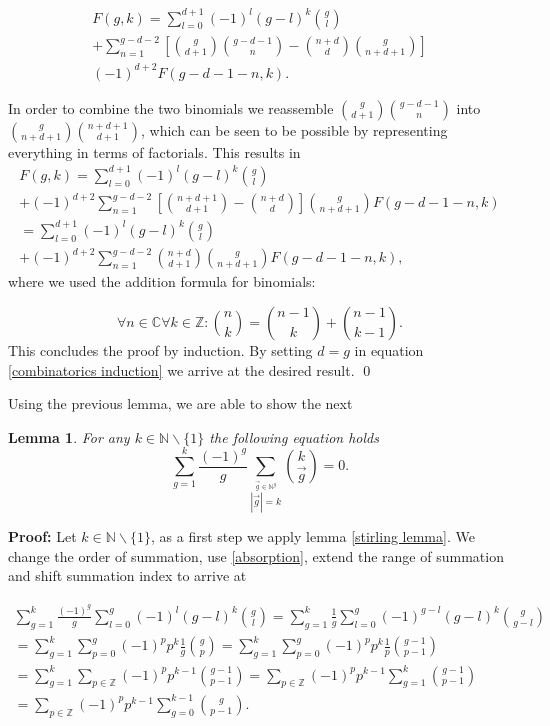 \documentclass[b5paper,draft,openbib,12pt]{memoir}
\newtheorem{Lemma}[Def]{Lemma}
\begin{document}
\begin{multline}
F(g,k)= \sum_{l=0}^{d+1} (-1)^l (g-l)^k \binom{g}{l}\\
+ \sum_{n=1}^{g-d-2}\left[\binom{g}{d+1} \binom{g-d-1}{n} - \binom{n+d}{d} \binom{g}{n+d+1} \right] 
\\(-1)^{d+2} F(g-d-1-n,k).
\end{multline}


In order to combine the two binomials we reassemble \(\binom{g}{d+1}\binom{g-d-1}{n}\) 
into \(\binom{g}{n+d+1}\binom{n+d+1}{d+1}\), which can be seen to be possible by representing everything
in terms of factorials. This results in
\begin{multline}
F(g,k)= \sum_{l=0}^{d+1} (-1)^l (g-l)^k \binom{g}{l}\\
+(-1)^{d+2} \sum_{n=1}^{g-d-2}\left[\binom{n+d+1}{d+1} - \binom{n+d}{d}\right] \binom{g}{n+d+1} 
 F(g-d-1-n,k)\\
=\sum_{l=0}^{d+1} (-1)^l (g-l)^k \binom{g}{l}\\
+(-1)^{d+2}  \sum_{n=1}^{g-d-2} \binom{n+d}{d+1} \binom{g}{n+d+1}  F(g-d-1-n,k),
\end{multline}
where we used the addition formula for binomials:

\begin{equation}
\forall n\in \mathbb{C} \forall k \in \mathbb{Z}: \binom{n}{k} = \binom{n-1}{k} + \binom{n-1}{k-1}.
\end{equation}
This concludes the proof by induction. By setting \(d=g\) in equation \eqref{combinatorics induction} 
we arrive at the desired result. \qed

Using the previous lemma, we are able to show the next

\begin{Lemma}\label{combinatorics weak conjecture lemma 2}
For any \(k \in \mathbb{N}\backslash \{1\}\) the following equation holds
\begin{equation}
\sum_{g=1}^k \frac{(-1)^g}{g} \sum_{\stackrel{\vec{g}\in\mathbb{N}^g}{|\vec{g}|=k}}\binom{k}{\vec{g}}=0.
\end{equation}
\end{Lemma}
\textbf{Proof:} Let \(k\in\mathbb{N}\backslash\{1\}\), as a first step we apply lemma \ref{stirling lemma}.
We change the order of summation, use \eqref{absorption}, extend the range of summation and shift 
summation index  to arrive at

\begin{multline}
\sum_{g=1}^k \frac{(-1)^g}{g} \sum_{l=0}^g (-1)^l (g-l)^k \binom{g}{l}
= \sum_{g=1}^k \frac{1}{g} \sum_{l=0}^g (-1)^{g-l} (g-l)^k \binom{g}{g-l}\\
= \sum_{g=1}^k \sum_{p=0}^g (-1)^{p} p^k \frac{1}{g} \binom{g}{p}
=\sum_{g=1}^k \sum_{p=0}^g (-1)^{p} p^k \frac{1}{p} \binom{g-1}{p-1}\\
=\sum_{g=1}^k \sum_{p\in\mathbb{Z}} (-1)^{p} p^{k-1}\binom{g-1}{p-1}
=\sum_{p\in\mathbb{Z}} (-1)^{p} p^{k-1} \sum_{g=1}^k \binom{g-1}{p-1}\\
=\sum_{p\in\mathbb{Z}} (-1)^{p} p^{k-1} \sum_{g=0}^{k-1} \binom{g}{p-1}.
\end{multline}
\end{document}
